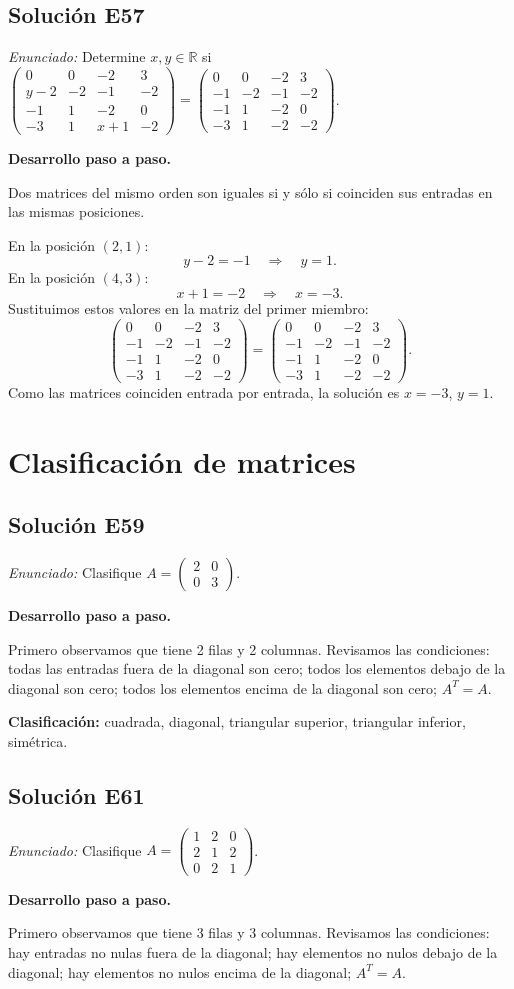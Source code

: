\documentclass[12pt]{article}
\theoremstyle{remark}
\newcommand{\solucion}[2]{\Needspace{11\baselineskip}\subsection*{Solución E#1}\noindent\textit{Enunciado:} #2\par\medskip\noindent\textbf{Desarrollo paso a paso.}\par\medskip}
\begin{document}
\solucion{57}{Determine $x,y\in\mathbb R$ si $\begin{pmatrix}0&0&-2&3\\y - 2&-2&-1&-2\\-1&1&-2&0\\-3&1&x + 1&-2\end{pmatrix}=\begin{pmatrix}0&0&-2&3\\-1&-2&-1&-2\\-1&1&-2&0\\-3&1&-2&-2\end{pmatrix}$.}
Dos matrices del mismo orden son iguales si y sólo si coinciden sus entradas en las mismas posiciones.

En la posición $(2,1)$:
\[
y - 2=-1\quad\Longrightarrow\quad y=1.
\]
En la posición $(4,3)$:
\[
x + 1=-2\quad\Longrightarrow\quad x=-3.
\]
Sustituimos estos valores en la matriz del primer miembro:
\[
\begin{pmatrix}0&0&-2&3\\-1&-2&-1&-2\\-1&1&-2&0\\-3&1&-2&-2\end{pmatrix}=\begin{pmatrix}0&0&-2&3\\-1&-2&-1&-2\\-1&1&-2&0\\-3&1&-2&-2\end{pmatrix}.
\]
Como las matrices coinciden entrada por entrada, la solución es $x=-3$, $y=1$.


\medskip

\section{Clasificación de matrices}

\solucion{59}{Clasifique $A=\begin{pmatrix}2&0\\0&3\end{pmatrix}$.}
Primero observamos que tiene 2 filas y 2 columnas. Revisamos las condiciones: todas las entradas fuera de la diagonal son cero; todos los elementos debajo de la diagonal son cero; todos los elementos encima de la diagonal son cero; $A^T=A$.

\textbf{Clasificación:} cuadrada, diagonal, triangular superior, triangular inferior, simétrica.


\medskip

\solucion{61}{Clasifique $A=\begin{pmatrix}1&2&0\\2&1&2\\0&2&1\end{pmatrix}$.}
Primero observamos que tiene 3 filas y 3 columnas. Revisamos las condiciones: hay entradas no nulas fuera de la diagonal; hay elementos no nulos debajo de la diagonal; hay elementos no nulos encima de la diagonal; $A^T=A$.
\end{document}
